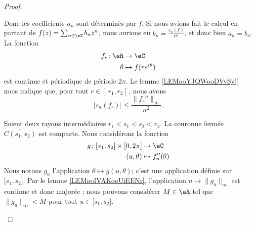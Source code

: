 \begin{proof}
\begin{subproof}
			Donc les coefficients \( a_n\) sont déterminés par \( f\). Si nous avions fait le calcul en partant de \( f(z)=\sum_{n\in \eZ}b_nz^n\), nous aurions eu \( b_n=\frac{ c_n(f) }{ r^n }\), et donc bien \( a_n=b_n\).
			La fonction
			\begin{equation}
				\begin{aligned}
					f_r\colon \eR & \to \eC                  \\
					\theta        & \mapsto f(r e^{i\theta})
				\end{aligned}
			\end{equation}
			est continue et périodique de période \( 2\pi\). Le lemme \ref{LEMooYJQWooDVvSyj} nous indique que, pour tout \( r\in \mathopen] r_1 , r_2 \mathclose[\), nous avons
		\begin{equation}        \label{EQooMDNNooPYFQrq}
			| c_n(f_r) |\leq \frac{ \| f_r'' \|_{\infty} }{ n^2 }.
		\end{equation}
		\begin{subproof}
			Soient deux rayons intermédiaires \( r_1<s_1<s_2<r_2\). La couronne fermée \( \overline{ C(s_1,s_2) }\) est compacte. Nous considérons la fonction
			\begin{equation}
				\begin{aligned}
					g\colon \mathopen[ s_1 , s_2 \mathclose]\times \mathopen[ 0 , 2\pi \mathclose] & \to \eC               \\
					(u,\theta)                                                                     & \mapsto f''_u(\theta)
				\end{aligned}
			\end{equation}
			Nous notons \( g_u\) l'application \( \theta\mapsto g(u,\theta)\); c'est une application définie sur \( \mathopen[ s_1 , s_2 \mathclose]\). Par le lemme \ref{LEMooIVAKooUiEENr}, l'application \( u\mapsto \| g_u \|_{\infty}\) est continue et donc majorée : nous pouvons considérer \( M\in \eR\) tel que \( \| g_u \|_{\infty}<M\) pour tout \( u\in \mathopen[ s_1 , s_2 \mathclose]\).


\end{subproof}
\end{subproof}
\end{proof}
